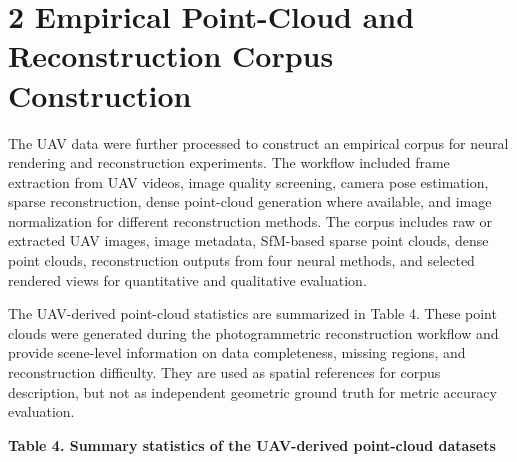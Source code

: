 \section{2 Empirical Point-Cloud and Reconstruction Corpus
Construction}\label{empirical-point-cloud-and-reconstruction-corpus-construction}

The UAV data were further processed to construct an empirical corpus for
neural rendering and reconstruction experiments. The workflow included
frame extraction from UAV videos, image quality screening, camera pose
estimation, sparse reconstruction, dense point-cloud generation where
available, and image normalization for different reconstruction methods.
The corpus includes raw or extracted UAV images, image metadata,
SfM-based sparse point clouds, dense point clouds, reconstruction
outputs from four neural methods, and selected rendered views for
quantitative and qualitative evaluation.

The UAV-derived point-cloud statistics are summarized in Table 4. These
point clouds were generated during the photogrammetric reconstruction
workflow and provide scene-level information on data completeness,
missing regions, and reconstruction difficulty. They are used as spatial
references for corpus description, but not as independent geometric
ground truth for metric accuracy evaluation.

\textbf{Table 4. Summary statistics of the UAV-derived point-cloud
datasets}


